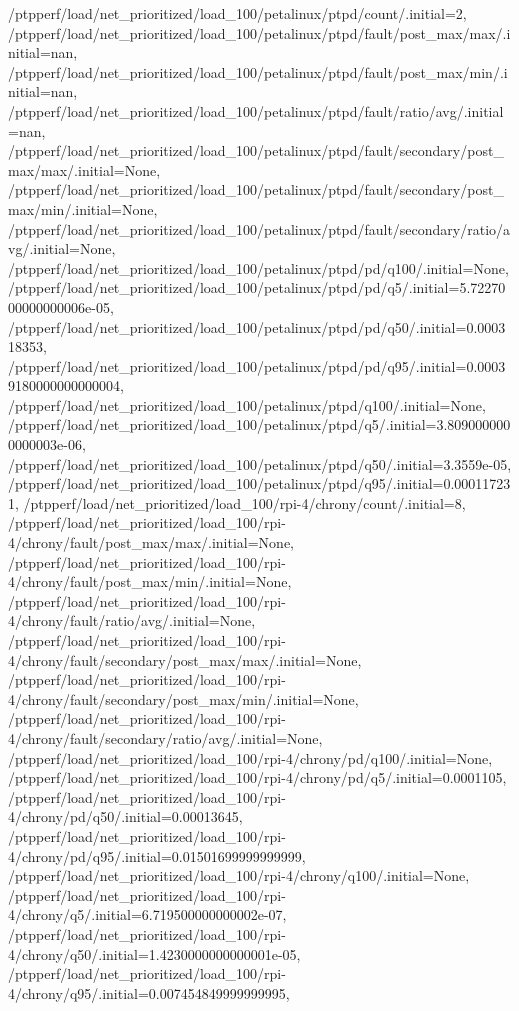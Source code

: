 {    /ptpperf/load/net_prioritized/load_100/petalinux/ptpd/count/.initial=2,
    /ptpperf/load/net_prioritized/load_100/petalinux/ptpd/fault/post_max/max/.initial=nan,
    /ptpperf/load/net_prioritized/load_100/petalinux/ptpd/fault/post_max/min/.initial=nan,
    /ptpperf/load/net_prioritized/load_100/petalinux/ptpd/fault/ratio/avg/.initial=nan,
    /ptpperf/load/net_prioritized/load_100/petalinux/ptpd/fault/secondary/post_max/max/.initial=None,
    /ptpperf/load/net_prioritized/load_100/petalinux/ptpd/fault/secondary/post_max/min/.initial=None,
    /ptpperf/load/net_prioritized/load_100/petalinux/ptpd/fault/secondary/ratio/avg/.initial=None,
    /ptpperf/load/net_prioritized/load_100/petalinux/ptpd/pd/q100/.initial=None,
    /ptpperf/load/net_prioritized/load_100/petalinux/ptpd/pd/q5/.initial=5.7227000000000006e-05,
    /ptpperf/load/net_prioritized/load_100/petalinux/ptpd/pd/q50/.initial=0.000318353,
    /ptpperf/load/net_prioritized/load_100/petalinux/ptpd/pd/q95/.initial=0.00039180000000000004,
    /ptpperf/load/net_prioritized/load_100/petalinux/ptpd/q100/.initial=None,
    /ptpperf/load/net_prioritized/load_100/petalinux/ptpd/q5/.initial=3.8090000000000003e-06,
    /ptpperf/load/net_prioritized/load_100/petalinux/ptpd/q50/.initial=3.3559e-05,
    /ptpperf/load/net_prioritized/load_100/petalinux/ptpd/q95/.initial=0.000117231,
    /ptpperf/load/net_prioritized/load_100/rpi-4/chrony/count/.initial=8,
    /ptpperf/load/net_prioritized/load_100/rpi-4/chrony/fault/post_max/max/.initial=None,
    /ptpperf/load/net_prioritized/load_100/rpi-4/chrony/fault/post_max/min/.initial=None,
    /ptpperf/load/net_prioritized/load_100/rpi-4/chrony/fault/ratio/avg/.initial=None,
    /ptpperf/load/net_prioritized/load_100/rpi-4/chrony/fault/secondary/post_max/max/.initial=None,
    /ptpperf/load/net_prioritized/load_100/rpi-4/chrony/fault/secondary/post_max/min/.initial=None,
    /ptpperf/load/net_prioritized/load_100/rpi-4/chrony/fault/secondary/ratio/avg/.initial=None,
    /ptpperf/load/net_prioritized/load_100/rpi-4/chrony/pd/q100/.initial=None,
    /ptpperf/load/net_prioritized/load_100/rpi-4/chrony/pd/q5/.initial=0.0001105,
    /ptpperf/load/net_prioritized/load_100/rpi-4/chrony/pd/q50/.initial=0.00013645,
    /ptpperf/load/net_prioritized/load_100/rpi-4/chrony/pd/q95/.initial=0.01501699999999999,
    /ptpperf/load/net_prioritized/load_100/rpi-4/chrony/q100/.initial=None,
    /ptpperf/load/net_prioritized/load_100/rpi-4/chrony/q5/.initial=6.719500000000002e-07,
    /ptpperf/load/net_prioritized/load_100/rpi-4/chrony/q50/.initial=1.4230000000000001e-05,
    /ptpperf/load/net_prioritized/load_100/rpi-4/chrony/q95/.initial=0.007454849999999995,
}
